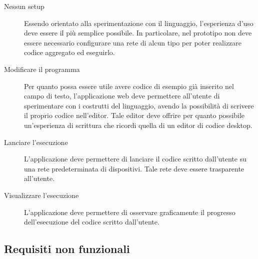       \begin{description}
        \item[Nessun setup]
          Essendo orientato alla sperimentazione con il linguaggio, l'esperienza d'uso deve essere il più semplice possibile.
          In particolare, nel prototipo non deve essere necessario configurare una rete di alcun tipo per poter realizzare codice aggregato ed eseguirlo.
        \item[Modificare il programma]
          Per quanto possa essere utile avere codice di esempio già inserito nel campo di testo, l'applicazione web deve permettere all'utente di sperimentare con i costrutti del linguaggio, avendo la possibilità di scrivere il proprio codice nell'editor.
          Tale editor deve offrire per quanto possibile un'esperienza di scrittura che ricordi quella di un editor di codice desktop.
        \item[Lanciare l'esecuzione]
          L'applicazione deve permettere di lanciare il codice scritto dall'utente su una rete predeterminata di dispositivi.
          Tale rete deve essere trasparente all'utente.
        \item[Visualizzare l'esecuzione]
          L'applicazione deve permettere di osservare graficamente il progresso dell'esecuzione del codice scritto dall'utente.
      \end{description}

    \subsection{Requisiti non funzionali}

